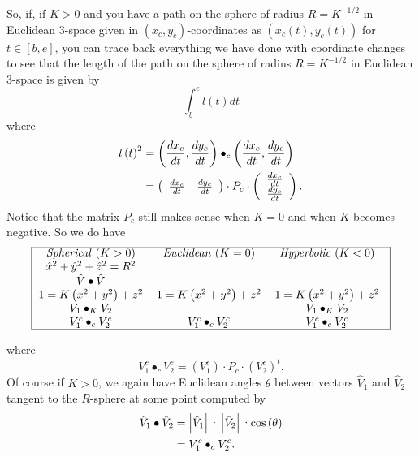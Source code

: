 \documentclass{article}%
\begin{document}
So, if, if $K>0$ and you have a path on the sphere of radius $R=K^{-1/2}$ in
Euclidean $3$-space given in $\left(  x_{c},y_{c}\right)  $-coordinates as
$\left(  x_{c}\left(  t\right)  ,y_{c}\left(  t\right)  \right)  $ for
$t\in\left[  b,e\right]  $, you can trace back everything we have done with
coordinate changes to see that the length of the path on the sphere of radius
$R=K^{-1/2}$ in Euclidean $3$-space is given by%
\[%
{\displaystyle\int\nolimits_{b}^{e}}
l\left(  t\right)  dt
\]
where%
\begin{align*}
l\left(  t\right)  ^{2}  &  =\left(  \frac{dx_{c}}{dt},\frac{dy_{c}}%
{dt}\right)  \bullet_{c}\left(  \frac{dx_{c}}{dt},\frac{dy_{c}}{dt}\right) \\
&  =\left(
\begin{array}
[c]{cc}%
\frac{dx_{c}}{dt} & \frac{dy_{c}}{dt}%
\end{array}
\right)  \cdot P_{c}\cdot\left(
\begin{array}
[c]{c}%
\frac{dx_{c}}{dt}\\
\frac{dy_{c}}{dt}%
\end{array}
\right)  .
\end{align*}
Notice that the matrix $P_{c}$ still makes sense when $K=0$ and when $K$
becomes negative. So we do have%
\[
\frame{%
\begin{tabular}
[c]{ccc}%
\textit{Spherical} ($K>0$) & \textit{Euclidean} ($K=0$) & \textit{Hyperbolic}
($K<0$)\\
$\hat{x}^{2}+\hat{y}^{2}+\hat{z}^{2}=R^{2}$ &  & \\
$\hat{V}\bullet\hat{V}$ &  & \\
$1=K\left(  x^{2}+y^{2}\right)  +z^{2}$ & $1=K\left(  x^{2}+y^{2}\right)
+z^{2}$ & $1=K\left(  x^{2}+y^{2}\right)  +z^{2}$\\
$V_{1}\bullet_{K}V_{2}$ &  & $V_{1}\bullet_{K}V_{2}$\\
$V_{1}^{c}\bullet_{c}V_{2}^{c}$ & $V_{1}^{c}\bullet_{c}V_{2}^{c}$ & $V_{1}%
^{c}\bullet_{c}V_{2}^{c}$%
\end{tabular}
}%
\]
where%
\[
V_{1}^{c}\bullet_{c}V_{2}^{c}=\left(  V_{1}^{c}\right)  \cdot P_{c}%
\cdot\left(  V_{2}^{c}\right)  ^{t}.
\]
Of course if $K>0$, we again have Euclidean angles $\theta$ between vectors
$\hat{V}_{1}$ and $\hat{V}_{2}$ tangent to the $R$-sphere at some point
computed by%
\begin{align*}
\hat{V}_{1}\bullet\hat{V}_{2}  &  =\left\vert \hat{V}_{1}\right\vert
\text{\textperiodcentered}\left\vert \hat{V}_{2}\right\vert
\text{\textperiodcentered\textrm{cos}}\left(  \theta\right) \\
&  =V_{1}^{c}\bullet_{c}V_{2}^{c}.
\end{align*}
\pagebreak
\end{document}
